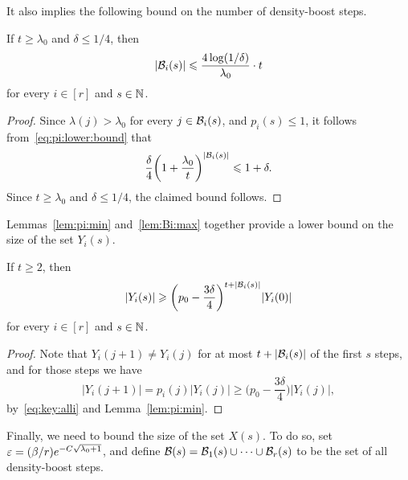 It also implies the following bound on the number of density-boost steps. 
%
\begin{lemma}
  \label{lem:Bi:max} %
  If \(t \ge \lambda_0\) and \(\delta \le 1/4\), then
  \begin{equation*}
    |\mathcal{B}_i(s)| \leqslant \frac{4 \log(1/\delta)}{\lambda_0} \cdot t
  \end{equation*}
  for every \(i \in [r]\) and \(s \in \mathbb{N}\). 
\end{lemma}
%
\begin{proof}
  Since \(\lambda(j) > \lambda_0\) for every \(j \in \mathcal{B}_i(s)\), and \(p_i(s) \le 1\), it follows from~\eqref{eq:pi:lower:bound} that
  \begin{equation*}
    \frac{\delta}{4} \bigg( 1 + \frac{\lambda_0}{t} \bigg)^{|\mathcal{B}_i(s)|} \leqslant 1 + \delta.
  \end{equation*}
  Since \(t \ge \lambda_0\) and \(\delta \le 1/4\), the claimed bound follows. 
\end{proof}

Lemmas~\ref{lem:pi:min} and~\ref{lem:Bi:max} together provide a lower bound on the size of the set \(Y_i(s)\). 

\begin{lemma}
  \label{lem:Y:lower:bound} %
  If \(t \ge 2\), then
  \begin{equation*}
    |Y_i(s)| \geqslant \bigg( p_0 - \frac{3\delta}{4} \bigg)^{t + |\mathcal{B}_i(s)|} |Y_i(0)|
  \end{equation*}
  for every \(i \in [r]\) and \(s \in \mathbb{N}\). 
\end{lemma}
%
\begin{proof}
  Note that \(Y_i(j+1) \ne Y_i(j)\) for at most \(t + |\mathcal{B}_i(s)|\) of the first \(s\) steps, and for those steps we have
  \begin{equation*}
    |Y_i(j+1)| = p_i(j) |Y_i(j)| \ge \bigg( p_0 - \frac{3\delta}{4} \bigg) |Y_i(j)|,
  \end{equation*}
  by~\eqref{eq:key:alli} and Lemma~\ref{lem:pi:min}.
\end{proof}

Finally, we need to bound the size of the set \(X(s)\). To do so, set \(\varepsilon = (\beta / r) e^{- C \sqrt{\lambda_0 + 1}}\), and define \(\mathcal{B}(s) = \mathcal{B}_1(s) \cup \cdots \cup \mathcal{B}_r(s)\) to be the set of all density-boost steps. 


